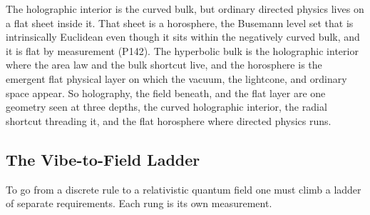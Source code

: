 The holographic interior is the curved bulk, but ordinary directed physics lives on a flat sheet inside it. That sheet is a horosphere, the Busemann level set that is intrinsically Euclidean even though it sits within the negatively curved bulk, and it is flat by measurement (P142). The hyperbolic bulk is the holographic interior where the area law and the bulk shortcut live, and the horosphere is the emergent flat physical layer on which the vacuum, the lightcone, and ordinary space appear. So holography, the field beneath, and the flat layer are one geometry seen at three depths, the curved holographic interior, the radial shortcut threading it, and the flat horosphere where directed physics runs.

\subsection{The Vibe-to-Field Ladder}

To go from a discrete rule to a relativistic quantum field one must climb a ladder of separate requirements. Each rung is its own measurement.


